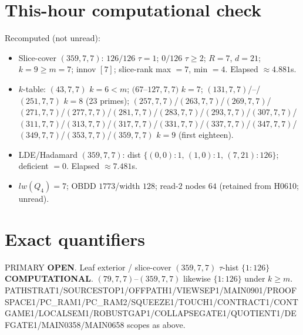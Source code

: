 \documentclass[11pt]{article}
\begin{document}
\section*{This-hour computational check}
Recomputed (not unread):
\begin{itemize}
\item Slice-cover $(359,7,7)$: $126/126$ $\tau{=}1$; $0/126$ $\tau{\ge}2$; $R{=}7$, $d{=}21$;
  $k{=}9{\ge}m{=}7$; innov $[7]$; slice-rank max $=7$, min $=4$. Elapsed $\approx4.881$s.
\item $k$-table: $(43,7,7)$ $k{=}6{<}m$; $(67$--$127,7,7)$ $k{=}7$;
  $(131,7,7)$/--/$(251,7,7)$ $k{=}8$ (23 primes); $(257,7,7)$/$(263,7,7)$/$(269,7,7)$/$(271,7,7)$/$(277,7,7)$/$(281,7,7)$/$(283,7,7)$/$(293,7,7)$/$(307,7,7)$/$(311,7,7)$/$(313,7,7)$/$(317,7,7)$/$(331,7,7)$/$(337,7,7)$/$(347,7,7)$/$(349,7,7)$/$(353,7,7)$/$(359,7,7)$ $k{=}9$ (first eighteen).
\item LDE/Hadamard $(359,7,7)$: dist $\{(0,0){:}1,\,(1,0){:}1,\,(7,21){:}126\}$; deficient $=0$. Elapsed $\approx7.481$s.
\item $lw(Q_4)=7$; OBDD $1773$/width $128$; read-$2$ nodes $64$ (retained from H0610; unread).
\end{itemize}

\section*{Exact quantifiers}
PRIMARY \textbf{OPEN}. Leaf exterior / slice-cover $(359,7,7)$ $\tau$-hist $\{1{:}126\}$ \textbf{COMPUTATIONAL}.
$(79,7,7)$--$(359,7,7)$ likewise $\{1{:}126\}$ under $k{\ge}m$.
PATHSTRAT1/SOURCESTOP1/OFFPATH1/VIEWSEP1/MAIN0901/PROOFSPACE1/PC\_RAM1/PC\_RAM2/SQUEEZE1/TOUCH1/CONTRACT1/CONTGAME1/LOCALSEM1/ROBUSTGAP1/COLLAPSEGATE1/QUOTIENT1/DEFGATE1/MAIN0358/MAIN0658 scopes as above.
\end{document}
